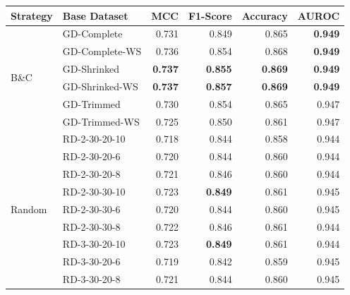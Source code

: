 \begin{table}[ht]
	\centering
	\small
	\begin{tabular}{llrrrr}
		\toprule
		Strategy                 & Base Dataset   & MCC            & F1-Score       & Accuracy       & AUROC          \\
		\midrule
		\multirow{6}{*}{B\&C}    & GD-Complete    & 0.731          & 0.849          & 0.865          & \textbf{0.949} \\
		                         & GD-Complete-WS & 0.736          & 0.854          & 0.868          & \textbf{0.949} \\
		                         & GD-Shrinked    & \textbf{0.737} & \textbf{0.855} & \textbf{0.869} & \textbf{0.949} \\
		                         & GD-Shrinked-WS & \textbf{0.737} & \textbf{0.857} & \textbf{0.869} & \textbf{0.949} \\
		                         & GD-Trimmed     & 0.730          & 0.854          & 0.865          & 0.947          \\
		                         & GD-Trimmed-WS  & 0.725          & 0.850          & 0.861          & 0.947          \\
		\midrule
		\multirow{21}{*}{Random} & RD-2-30-20-10  & 0.718          & 0.844          & 0.858          & 0.944          \\
		                         & RD-2-30-20-6   & 0.720          & 0.844          & 0.860          & 0.944          \\
		                         & RD-2-30-20-8   & 0.721          & 0.846          & 0.860          & 0.944          \\
		                         & RD-2-30-30-10  & 0.723          & \textbf{0.849} & 0.861          & 0.945          \\
		                         & RD-2-30-30-6   & 0.720          & 0.844          & 0.860          & 0.945          \\
		                         & RD-2-30-30-8   & 0.722          & 0.846          & 0.861          & 0.944          \\
		                         & RD-3-30-20-10  & 0.723          & \textbf{0.849} & 0.861          & 0.944          \\
		                         & RD-3-30-20-6   & 0.719          & 0.842          & 0.859          & 0.945          \\
		                         & RD-3-30-20-8   & 0.721          & 0.844          & 0.860          & 0.945          \\

\end{tabular}
\end{table}
